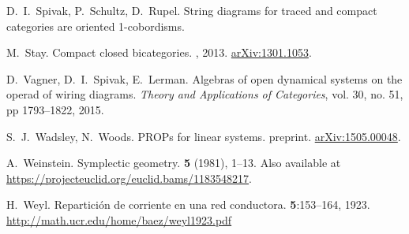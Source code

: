 \begin{thebibliography}{RSW00}
    D.\ I.\ Spivak, P.\ Schultz, D.\ Rupel.
    \newblock String diagrams for traced and compact categories are oriented 1-cobordisms.

    M.\ Stay.
    \newblock Compact closed bicategories.
    , 2013. 
    \newblock \href{http://arxiv.org/abs/1301.1053}{arXiv:1301.1053}.


    D.\ Vagner, D.\ I.\ Spivak, E.\ Lerman.
    \newblock Algebras of open
    dynamical systems on the operad of wiring diagrams.
    \newblock \emph{Theory and
    Applications of Categories}, vol. 30, no. 51, pp 1793--1822, 2015. 





     S.\ J.\ Wadsley, N.\ Woods. 
    \newblock PROPs for linear systems.
    \newblock preprint. 
    \newblock \href{http://arxiv.org/abs/1505.00048}{arXiv:1505.00048}.

    A.\ Weinstein.
    \newblock Symplectic geometry.
     {\bf 5} (1981), 1--13.
    \newblock Also available at 	
    \href{https://projecteuclid.org/euclid.bams/1183548217}
    {https://projecteuclid.org/euclid.bams/1183548217}.

    H.\ Weyl.
    \newblock Repartici\'on de corriente en una red conductora.
     {\bf 5}:153--164, 1923.
    \newblock \href{http://math.ucr.edu/home/baez/weyl1923.pdf}{http://math.ucr.edu/home/baez/weyl1923.pdf}


\end{thebibliography}
